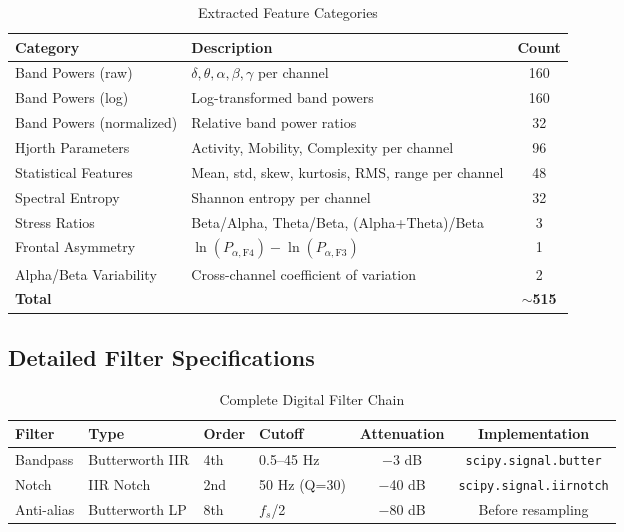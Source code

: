 \documentclass[11pt,a4paper]{article}
\begin{document}
\begin{table}[H]
\centering
\caption{Extracted Feature Categories}
\small
\begin{tabular}{llc}
\toprule
\textbf{Category} & \textbf{Description} & \textbf{Count} \\
\midrule
Band Powers (raw) & $\delta, \theta, \alpha, \beta, \gamma$ per channel & 160 \\
Band Powers (log) & Log-transformed band powers & 160 \\
Band Powers (normalized) & Relative band power ratios & 32 \\
Hjorth Parameters & Activity, Mobility, Complexity per channel & 96 \\
Statistical Features & Mean, std, skew, kurtosis, RMS, range per channel & 48 \\
Spectral Entropy & Shannon entropy per channel & 32 \\
Stress Ratios & Beta/Alpha, Theta/Beta, (Alpha+Theta)/Beta & 3 \\
Frontal Asymmetry & $\ln(P_{\alpha,\text{F4}}) - \ln(P_{\alpha,\text{F3}})$ & 1 \\
Alpha/Beta Variability & Cross-channel coefficient of variation & 2 \\
\midrule
\textbf{Total} & & \textbf{$\sim$515} \\
\bottomrule
\end{tabular}
\end{table}


\subsection{Detailed Filter Specifications}

\begin{table}[H]
\centering
\caption{Complete Digital Filter Chain}
\small
\begin{tabular}{llllcc}
\toprule
\textbf{Filter} & \textbf{Type} & \textbf{Order} & \textbf{Cutoff} & \textbf{Attenuation} & \textbf{Implementation} \\
\midrule
Bandpass & Butterworth IIR & 4th & 0.5--45 Hz & $-$3 dB & \texttt{scipy.signal.butter} \\
Notch & IIR Notch & 2nd & 50 Hz (Q=30) & $-$40 dB & \texttt{scipy.signal.iirnotch} \\
Anti-alias & Butterworth LP & 8th & $f_s$/2 & $-$80 dB & Before resampling \\
\bottomrule
\end{tabular}
\end{table}
\end{document}

